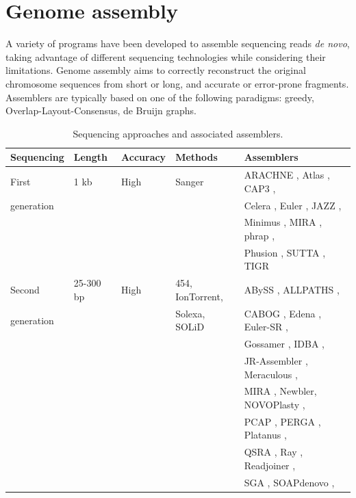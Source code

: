 \section{Genome assembly}

A variety of programs have been developed to assemble sequencing reads \textit{de novo}, taking advantage of different sequencing technologies while considering their limitations. Genome assembly aims to correctly reconstruct the original chromosome sequences from short or long, and accurate or error-prone fragments. Assemblers are typically based on one of the following paradigms: greedy, Overlap-Layout-Consensus, de Bruijn graphs. \\

\begin{table}
\caption{Sequencing approaches and associated assemblers.}
\centering
\begin{tabular}{|l|l|l|l|l|}
    \hline
    \textbf{Sequencing} & \textbf{Length} & \textbf{Accuracy} & \textbf{Methods} & \textbf{Assemblers}\\
    \hline
    First & 1 kb & High & Sanger & ARACHNE \cite{arachne}, Atlas \cite{atlas}, CAP3 \cite{cap3}, \\
    generation &  &  &  & Celera \cite{celera}, Euler \cite{euler}, JAZZ \cite{jazz},  \\
        &  &  &  & Minimus \cite{minimus}, MIRA \cite{mira}, phrap \cite{phrap}, \\
        &  &  &  & Phusion \cite{phusion}, SUTTA \cite{sutta}, TIGR \cite{tigr} \\
    \hline
    Second & 25-300 bp & High & 454, IonTorrent, & ABySS \cite{abyss,abyss2}, ALLPATHS \cite{allpaths}, \\
    generation &  &  & Solexa, SOLiD & CABOG \cite{cabog}, Edena \cite{edena}, Euler-SR \cite{euler-sr}, \\
        &  &  &  & Gossamer \cite{gossamer}, IDBA \cite{idba}, \\
        &  &  &  & JR-Assembler \cite{jr-assembler}, Meraculous \cite{meraculous}, \\
        &  &  &  & MIRA \cite{mira}, Newbler, NOVOPlasty \cite{novoplasty},  \\ 
        &  &  &  & PCAP \cite{pcap}, PERGA \cite{perga}, Platanus \cite{platanus},  \\
        &  &  &  & QSRA \cite{qsra}, Ray \cite{ray}, Readjoiner \cite{readjoiner}, \\
        &  &  &  & SGA \cite{sga}, SOAPdenovo \cite{soapdenovo}, \\

\end{tabular}
\end{table}
